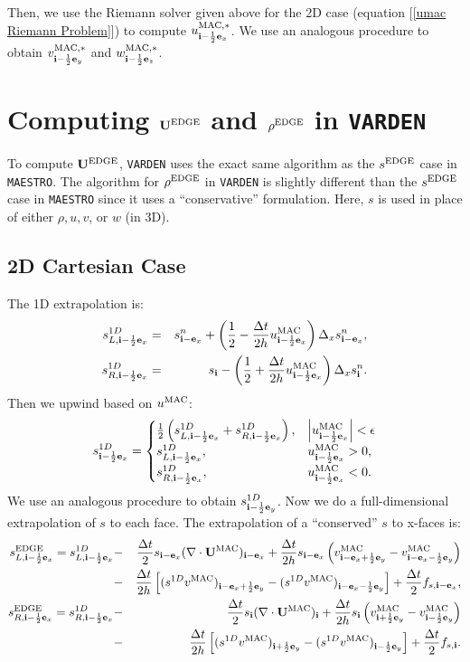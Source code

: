 \documentclass[11pt]{article}
\def\half  {\frac{1}{2}}
\def\dt    {\Delta t}
\def\edge  {\rm EDGE}
\def\mac   {\rm MAC}
\def\eb    {{\bf e}}
\def\ib    {{\bf i}}
\def\Ub    {{\bf U}}
\begin{document}
Then, we use the Riemann solver given above for the 2D case (equation [\ref{umac Riemann Problem}]) to compute $u_{\ib-\half\eb_x}^{\mac,*}$.  We use an analogous procedure to obtain $v_{\ib-\half\eb_y}^{\mac,*}$ and $w_{\ib-\half\eb_z}^{\mac,*}$.
\cleardoublepage
\section{Computing $\Ub^{\edge}$ and $\rho^{\edge}$ in {\tt VARDEN}}
To compute $\Ub^{\edge}$, {\tt VARDEN} uses the exact same algorithm as the $s^{\edge}$ case in {\tt MAESTRO}.  The algorithm for $\rho^{\edge}$ in {\tt VARDEN} is slightly different than the $s^{\edge}$ case in {\tt MAESTRO} since it uses a ``conservative'' formulation.  Here, $s$ is used in place of either $\rho, u, v$, or $w$ (in 3D).
\subsection{2D Cartesian Case}
The 1D extrapolation is:
\begin{eqnarray}
s_{L,\ib-\half\eb_x}^{1D} &=& s_{\ib-\eb_x}^n + \left(\half - \frac{\dt}{2h}u_{\ib-\half\eb_x}^{\mac}\right)\Delta_x s_{\ib-\eb_x}^n, \label{varden s_L^1D}\\
s_{R,\ib-\half\eb_x}^{1D} &=& s_{\ib} - \left(\half + \frac{\dt}{2h}u_{\ib-\half\eb_x}^{\mac}\right)\Delta_x s_{\ib}^n. \label{varden s_R^1D}
\end{eqnarray}
Then we upwind based on $u^{\mac}$:
\begin{equation}
s_{\ib-\half\eb_x}^{1D} =
\begin{cases}
\half\left(s_{L,\ib-\half\eb_x}^{1D} + s_{R,\ib-\half\eb_x}^{1D}\right), & \left|u^{\mac}_{\ib-\half\eb_x}\right| < \epsilon \\
s_{L,\ib-\half\eb_x}^{1D}, & u^{\mac}_{\ib-\half\eb_x} > 0, \\
s_{R,\ib-\half\eb_x}^{1D}, & u^{\mac}_{\ib-\half\eb_x} < 0. \\
\end{cases}
\end{equation}
We use an analogous procedure to obtain $s_{\ib-\half\eb_y}^{1D}$.  Now we do a full-dimensional extrapolation of $s$ to each face.  The extrapolation of a ``conserved'' $s$ to x-faces is:
\begin{eqnarray}
s_{L,\ib-\half\eb_x}^{\edge} = s_{L,\ib-\half\eb_x}^{1D} &-& \frac{\dt}{2}s_{\ib-\eb_x}(\nabla\cdot\Ub^{\mac})_{\ib-\eb_x} + \frac{\dt}{2h}s_{\ib-\eb_x}\left(v_{\ib-\eb_x+\half\eb_y}^{\mac} - v_{\ib-\eb_x-\half\eb_y}^{\mac}\right) \nonumber \\
&-& \frac{\dt}{2h}\left[(s^{1D} v^{\mac})_{\ib-\eb_x+\half\eb_y} - (s^{1D} v^{\mac})_{\ib-\eb_x-\half\eb_y}\right] + \frac{\dt}{2}f_{s,\ib-\eb_x}, \\
s_{R,\ib-\half\eb_x}^{\edge} = s_{R,\ib-\half\eb_x}^{1D} &-& \frac{\dt}{2}s_{\ib}(\nabla\cdot\Ub^{\mac})_{\ib} + \frac{\dt}{2h}s_{\ib}\left(v_{\ib+\half\eb_y}^{\mac} - v_{\ib-\half\eb_y}^{\mac}\right) \nonumber \\
&-& \frac{\dt}{2h}\left[(s^{1D} v^{\mac})_{\ib+\half\eb_y} - (s^{1D} v^{\mac})_{\ib-\half\eb_y}\right] + \frac{\dt}{2}f_{s,\ib}.
\end{eqnarray}
\end{document}
